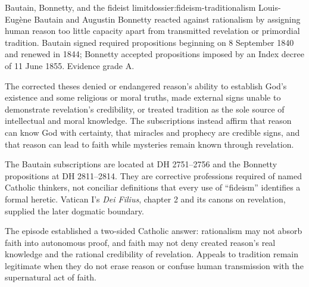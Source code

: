 \begin{heresydossier}{Bautain, Bonnetty, and the fideist limit}{dossier:fideism-traditionalism}
\objectfield Louis-Eug\`ene Bautain and Augustin Bonnetty reacted against rationalism by assigning human reason too little capacity apart from transmitted revelation or primordial tradition. Bautain signed required propositions beginning on 8 September 1840 and renewed in 1844; Bonnetty accepted propositions imposed by an Index decree of 11 June 1855. Evidence grade A.

\propositionfield The corrected theses denied or endangered reason's ability to establish God's existence and some religious or moral truths, made external signs unable to demonstrate revelation's credibility, or treated tradition as the sole source of intellectual and moral knowledge. The subscriptions instead affirm that reason can know God with certainty, that miracles and prophecy are credible signs, and that reason can lead to faith while mysteries remain known through revelation.

\responsefield The Bautain subscriptions are located at DH 2751--2756 and the Bonnetty propositions at DH 2811--2814. They are corrective professions required of named Catholic thinkers, not conciliar definitions that every use of ``fideism'' identifies a formal heretic. Vatican I's \emph{Dei Filius}, chapter 2 and its canons on revelation, supplied the later dogmatic boundary.

\aftermathfield The episode established a two-sided Catholic answer: rationalism may not absorb faith into autonomous proof, and faith may not deny created reason's real knowledge and the rational credibility of revelation. Appeals to tradition remain legitimate when they do not erase reason or confuse human transmission with the supernatural act of faith.
\end{heresydossier}

